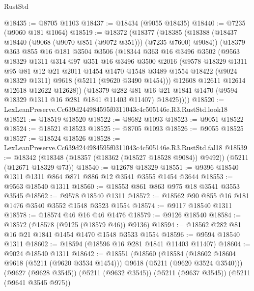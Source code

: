 \begin{lexlean}{RustStd}
\begin{coremodule}
@18435 := @8705 @1103
@18437 := @18434 (@9055 @18435)
@18440 := @7235 (@9060 @181 @1064)
@18519 := @18372
    (@18377
      (@18385
        (@18388 (@18437 @18440 (@9068 (@9070 @851 (@9072 @351))) (@7235 @7600) @9084))
        (@18379
          @363
          @855
          @16
          @181
          @3504
          @3506
          (@18344
            @363
            @16
            @3496
            @3502
            (@9563
              @18329
              @1311
              @314
              @97
              @351
              @16
              @3496
              @3500
              @2016
              (@9578
                @18329
                @1311
                @95
                @81
                @12
                @21
                @2011
                @1454
                @1470
                @1548
                @3489
                @1554
                @18422
                (@9024 @18329 @1311)
                @9618
                (@5211 (@9620 @3490 @1454)))
              @12608
              @12611
              @12614
              @12618
              @12622
              @12628))
          (@18379
            @282
            @81
            @16
            @21
            @1841
            @1470
            (@9594 @18329 @1311 @16 @281 @1841 @11403 @11407)
            @18425))))
@18520 := LexLeanPreserve.Cc639d244984595f0311043c4c505146e.R3.RustStd.look18
@18521 := @18519 @18520
@18522 := @8682 @1093
@18523 := @9051 @18522
@18524 := @18521 @18523
@18525 := @8705 @1093
@18526 := @9055 @18525
@18527 := @18524 @18526
@18528 := LexLeanPreserve.Cc639d244984595f0311043c4c505146e.R3.RustStd.fal18
@18539 := @18342 (@18348 (@18357 (@18362 (@18527 @18528 @9084)) @9492)) (@5211 (@12671 @18329 @73))
@18540 := @12678 @18329
@18551 := @9396 @18540 @1311 @1311 @864 @871 @886 @12 @3541 @3555 @1454 @3644
@18553 := @9563 @18540 @1311
@18560 := @18553 @861 @863 @975 @18 @3541 @3553 @3545
@18562 := @9578 @18540 @1311
@18572 := @18562 @90 @855 @16 @181 @1476 @3540 @3552 @1548 @3523 @1554
@18574 := @9117 @18540 @1311
@18578 := @18574 @46 @16 @46 @1476
@18579 := @9126 @18540
@18584 := @18572 (@18578 (@9125 (@18579 @46)) @9136)
@18594 := @18562 @282 @81 @16 @21 @1841 @1454 @1470 @1548 @3533 @1554
@18596 := @9594 @18540 @1311
@18602 := @18594 (@18596 @16 @281 @1841 @11403 @11407)
@18604 := @9024 @18540 @1311
@18642 := @18551
    (@18560
      (@18584 (@18602 @18604 @9618 (@5211 (@9620 @3534 @1454))) @9618 (@5211 (@9620 @3524 @3540)))
      (@9627 (@9628 @3545))
      (@5211 (@9632 @3545))
      (@5211 (@9637 @3545))
      (@5211 (@9641 @3545 @975))

\end{coremodule}
\end{lexlean}

